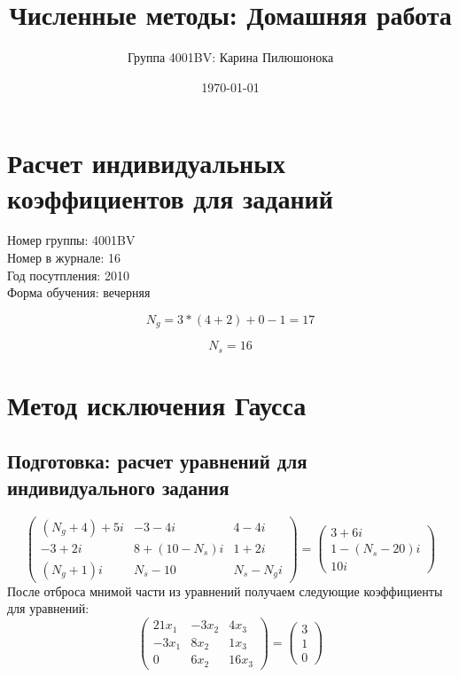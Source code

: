 \documentclass{article}
\title{Численные методы: Домашняя работа}
\author{Группа 4001BV: Карина Пилюшонока}
\date \today
\begin{document}
\maketitle
\newpage
\tableofcontents
\newpage
\section{Расчет индивидуальных коэффициентов для заданий}
Номер группы: 4001BV \\
Номер в журнале: 16 \\
Год посутпления: 2010 \\
Форма обучения: вечерняя

\begin{displaymath} 
  N_{g} = 3 * (4 + 2) + 0 - 1 = 17
\end{displaymath}

\begin{displaymath}
  N_{s} = 16
\end{displaymath}
\section{Метод исключения Гаусса}
\subsection{Подготовка: расчет уравнений для индивидуального задания}
\begin{displaymath}
\left(
  \begin{array}{ccc}
    (N_{g}+4)+5i & -3-4i & 4-4i \\
    -3+2i & 8+(10-N_{s})i & 1+2i \\
    (N_{g}+1)i & N_{s}-10 & N_{s}-N_{g}i
  \end{array}
\right)
=
\left(
  \begin{array}{ccc}
    3+6i\\
    1-(N_{s}-20)i\\
    10i
  \end{array}
\right)
\end{displaymath}
После отброса мнимой части из уравнений получаем следующие коэффициенты для
уравнений:
\begin{displaymath}
\left(
  \begin{array}{ccc}
    21 x_{1} & -3 x_{2} & 4 x_{3} \\
    -3 x_{1} & 8 x_{2} & 1 x_{3} \\
    0 & 6 x_{2} & 16 x_{3}
  \end{array}
\right)
=
\left(
  \begin{array}{ccc}
    3\\
    1\\
    0
  \end{array}
\right)
\end{displaymath}
\end{document}
